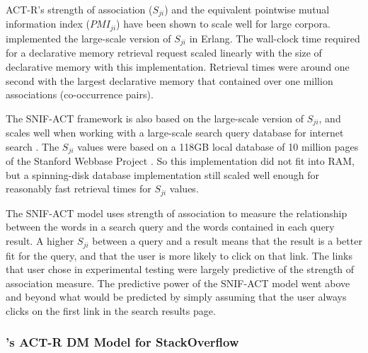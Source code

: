 \documentclass[man,floatsintext]{apa6}
\begin{document}
ACT-R's strength of association ($S_{ji}$) and the equivalent pointwise mutual information index ($\mathit{PMI}_{ji}$) have been shown to scale well for large corpora.
\textcite{Douglass2010} implemented the large-scale version of $S_{ji}$ in Erlang.
The wall-clock time required for a declarative memory retrieval request scaled linearly with the size of declarative memory with this implementation.
Retrieval times were around one second with the largest declarative memory that contained over one million associations (co-occurrence pairs).

The SNIF-ACT framework is also based on the large-scale version of $S_{ji}$, and scales well when working with a large-scale search query database for internet search \parencites{Fu2007,Pirolli2003}.
The $S_{ji}$ values were based on a 118GB local database of 10 million pages of the Stanford Webbase Project \parencite{Farahat2004}.
So this implementation did not fit into RAM, but a spinning-disk database implementation still scaled well enough for reasonably fast retrieval times for $S_{ji}$ values.

The SNIF-ACT model uses strength of association to measure the relationship between the words in a search query and the words contained in each query result.
A higher $S_{ji}$ between a query and a result means that the result is a better fit for the query, and that the user is more likely to click on that link.
The links that user chose in experimental testing were largely predictive of the strength of association measure.
The predictive power of the SNIF-ACT model went above and beyond what would be predicted by simply assuming that the user always clicks on the first link in the search results page.

\subsubsection{\textcite{Stanley2013}'s ACT-R DM Model for StackOverflow}
\end{document}
